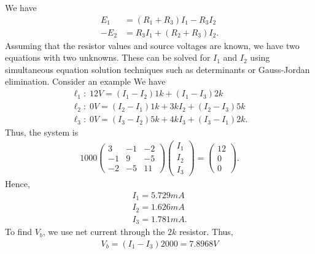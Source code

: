 \documentclass{report}
\begin{document}
\begin{itemize}
            \bigbreak \noindent 
            We have
            \begin{align*}
                E_{1} &= (R_{1} + R_{3})I_{1} - R_{3}I_{2} \\
                -E_{2} &= R_{3}I_{1} + (R_{2}+R_{3})I_{2}
            .\end{align*}
            Assuming that the resistor values and source voltages are known, we have two equations with two unknowns. These can be solved for $I_1$ and $I_2$ using simultaneous equation solution techniques such as determinants or Gauss-Jordan elimination.
            \bigbreak \noindent 
            Consider an example
            \bigbreak \noindent 
            \bigbreak \noindent 
            We have
            \begin{align*}
                \ell_{1}:\; 12V = (I_{1} - I_{2})1k + (I_{1}-I_{3})2k \\
                \ell_{2}:\; 0V = (I_{2}-I_{1})1k + 3kI_{2}+(I_{2} - I_{3})5k \\
                \ell_{3}:\; 0V = (I_{3} - I_{2})5k + 4kI_{3} + (I_{3} - I_{1})2k
            .\end{align*}
            Thus, the system is 
            \begin{align*}
                1000\begin{pmatrix} 3 & -1 & -2 \\-1 & 9 & -5 \\ -2 & -5 & 11 \end{pmatrix}\begin{pmatrix} I_{1} \\ I_{2} \\ I_{3} \end{pmatrix} = \begin{pmatrix} 12 \\ 0 \\ 0 \end{pmatrix}
            .\end{align*}
            Hence,
            \begin{align*}
                I_{1} = 5.729mA \\
                I_{2} = 1.626mA \\
                I_{3} = 1.781mA 
            .\end{align*}
            To find $V_{b}$, we use net current through the $2k$ resistor. Thus,
            \begin{align*}
                V_{b} = (I_{1} - I_{3})2000 = 7.8968V

\end{align*}
\end{itemize}
\end{document}
